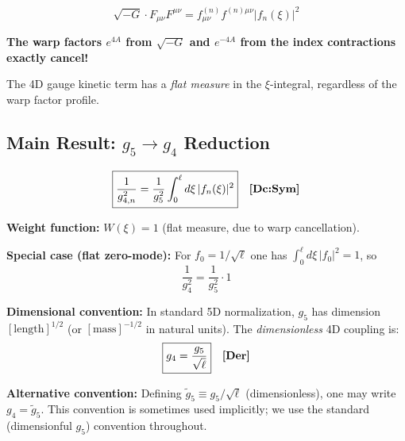 \begin{tcolorbox}[colback=green!5!white, colframe=green!50!black,
    title=\textbf{Warp Factor Cancellation}]
\begin{equation}
    \sqrt{-G} \cdot F_{\mu\nu} F^{\mu\nu} = f_{\mu\nu}^{(n)} f^{(n)\mu\nu} |f_n(\xi)|^2
    \label{eq:opr19_cancellation}
\end{equation}

\textbf{The warp factors $e^{4A}$ from $\sqrt{-G}$ and $e^{-4A}$ from the
index contractions exactly cancel!}

The 4D gauge kinetic term has a \emph{flat measure} in the $\xi$-integral,
regardless of the warp factor profile.
\end{tcolorbox}

\subsection{Main Result: $g_5 \to g_4$ Reduction}

\begin{tcolorbox}[colback=red!5!white, colframe=red!50!black,
    title=\textbf{Result: Coupling Reduction Formula}]
\begin{equation}
    \boxed{\frac{1}{g_{4,n}^2} = \frac{1}{g_5^2} \int_0^\ell d\xi \, |f_n(\xi)|^2}
    \quad \textbf{[Dc:Sym]}{}
    \label{eq:opr19_result}
\end{equation}

\textbf{Weight function:} $W(\xi) = 1$ (flat measure, due to warp cancellation).

\textbf{Special case (flat zero-mode):}
For $f_0 = 1/\sqrt{\ell}$ one has $\int_0^\ell d\xi\,|f_0|^2 = 1$, so
\begin{equation}
    \frac{1}{g_4^2} = \frac{1}{g_5^2} \cdot 1
    \label{eq:opr19_flat_integral}
\end{equation}

\textbf{Dimensional convention:} In standard 5D normalization, $g_5$ has dimension
$[\text{length}]^{1/2}$ (or $[\text{mass}]^{-1/2}$ in natural units).
The \emph{dimensionless} 4D coupling is:
\begin{equation}
    \boxed{g_4 = \frac{g_5}{\sqrt{\ell}}} \quad \textbf{[Der]}{}
    \label{eq:opr19_flat}
\end{equation}

\textbf{Alternative convention:} Defining $\tilde{g}_5 \equiv g_5/\sqrt{\ell}$
(dimensionless), one may write $g_4 = \tilde{g}_5$. This convention is sometimes
used implicitly; we use the standard (dimensionful $g_5$) convention throughout.
\end{tcolorbox}

